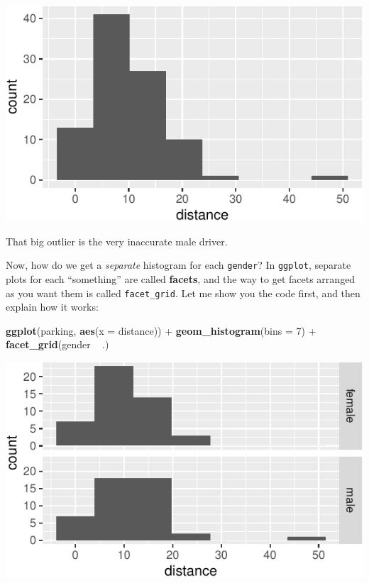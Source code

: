 \documentclass[]{tufte-book}
\newenvironment{Shaded}{}{}
\newcommand{\DataTypeTok}[1]{\textcolor[rgb]{0.56,0.13,0.00}{#1}}
\newcommand{\DecValTok}[1]{\textcolor[rgb]{0.25,0.63,0.44}{#1}}
\newcommand{\KeywordTok}[1]{\textcolor[rgb]{0.00,0.44,0.13}{\textbf{#1}}}
\newcommand{\NormalTok}[1]{#1}
\newcommand{\OperatorTok}[1]{\textcolor[rgb]{0.40,0.40,0.40}{#1}}
\newcommand{\StringTok}[1]{\textcolor[rgb]{0.25,0.44,0.63}{#1}}
\theoremstyle{definition}
\theoremstyle{definition}
\theoremstyle{definition}
\theoremstyle{remark}
\begin{document}
\includegraphics{05-two-sample-inference_files/figure-latex/unnamed-chunk-19-1}

That big outlier is the very inaccurate male driver.

Now, how do we get a \emph{separate} histogram for each \texttt{gender}?
In \texttt{ggplot}, separate plots for each ``something'' are called
\textbf{facets}, and the way to get facets arranged as you want them is
called \texttt{facet\_grid}. Let me show you the code first, and then
explain how it works:

\begin{Shaded}
\begin{Highlighting}[]
\KeywordTok{ggplot}\NormalTok{(parking, }\KeywordTok{aes}\NormalTok{(}\DataTypeTok{x =}\NormalTok{ distance)) }\OperatorTok{+}\StringTok{ }\KeywordTok{geom_histogram}\NormalTok{(}\DataTypeTok{bins =} \DecValTok{7}\NormalTok{) }\OperatorTok{+}\StringTok{ }
\StringTok{    }\KeywordTok{facet_grid}\NormalTok{(gender }\OperatorTok{~}\StringTok{ }\NormalTok{.)}
\end{Highlighting}
\end{Shaded}

\includegraphics{05-two-sample-inference_files/figure-latex/unnamed-chunk-20-1}
\end{document}
